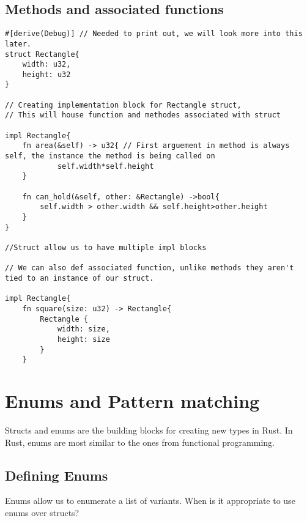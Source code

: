 \subsection{Methods and associated functions}
\begin{lstlisting}
#[derive(Debug)] // Needed to print out, we will look more into this later.
struct Rectangle{
    width: u32,
    height: u32
}

// Creating implementation block for Rectangle struct,
// This will house function and methodes associated with struct

impl Rectangle{
    fn area(&self) -> u32{ // First arguement in method is always self, the instance the method is being called on
            self.width*self.height
    }

    fn can_hold(&self, other: &Rectangle) ->bool{
        self.width > other.width && self.height>other.height
    }
}

//Struct allow us to have multiple impl blocks

// We can also def associated function, unlike methods they aren't tied to an instance of our struct.

impl Rectangle{
    fn square(size: u32) -> Rectangle{
        Rectangle { 
            width: size, 
            height: size 
        }
    }
\end{lstlisting}

\section{Enums and Pattern matching}
Structs and enums are the building blocks for creating new types in Rust. In Rust, enums are most similar to the ones from functional programming.

\subsection{Defining Enums}
Enums allow us to enumerate a list of variants. When is it appropriate to use enums over structs?

